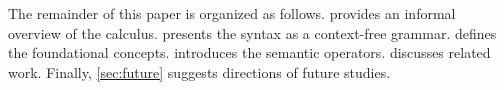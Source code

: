 The remainder of this paper is organized as follows.
 provides an informal overview of the calculus.
 presents the syntax as a context-free grammar.
 defines the foundational concepts.
 introduces the semantic operators.
 discusses related work.
Finally, \cref{sec:future} suggests directions of future studies.
